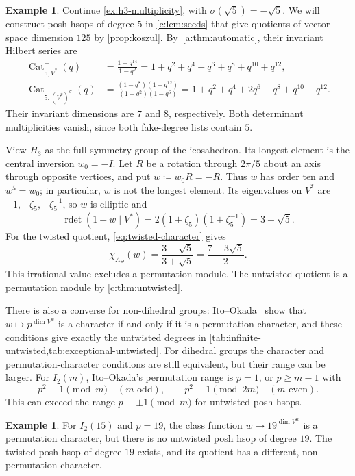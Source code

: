 \documentclass[11pt]{amsart}
\newcommand{\defeq}{\coloneqq}
\DeclareMathOperator{\Cat}{Cat}
\DeclareMathOperator{\rdet}{rdet}
\theoremstyle{definition}
\newtheorem{example}[theorem]{Example}
\begin{document}
\begin{example}\label{ex:h3-two-types}
Continue \cref{ex:h3-multiplicity}, with $\sigma(\sqrt5)=-\sqrt5$. We will construct posh hsops of degree $5$ in \cref{c:lem:seeds}
that give quotients of vector-space dimension $125$ by \cref{prop:koszul}.
By~\cref{a:thm:automatic}, their invariant Hilbert series are
\begin{align*}
 \Cat^+_{5,V^*}(q)
 &=\frac{1-q^{14}}{1-q^2}
   =1+q^2+q^4+q^6+q^8+q^{10}+q^{12},\\
 \Cat^+_{5,(V^*)^\sigma}(q)
 &=\frac{(1-q^8)(1-q^{12})}{(1-q^2)(1-q^6)}
   =1+q^2+q^4+2q^6+q^8+q^{10}+q^{12}.
\end{align*}
Their invariant dimensions are $7$ and $8$, respectively. Both
determinant multiplicities vanish, since both fake-degree lists contain $5$.

View $H_3$ as the full symmetry group of the icosahedron. Its longest
element is the central inversion $w_0=-I$. Let $R$ be a rotation through
$2\pi/5$ about an axis through opposite vertices, and put
$w\defeq w_0R=-R$. Thus $w$ has order ten and $w^5=w_0$; in particular,
$w$ is not the longest element. Its eigenvalues on $V^*$ are
$-1,-\zeta_5,-\zeta_5^{-1}$, so $w$ is elliptic and
\[
 \rdet(1-w\mid V^*)=2(1+\zeta_5)(1+\zeta_5^{-1})=3+\sqrt5.
\]
For the twisted quotient, \cref{eq:twisted-character} gives
\[
 \chi_{A_\Theta}(w)=\frac{3-\sqrt5}{3+\sqrt5}
                  =\frac{7-3\sqrt5}{2}.
\]
This irrational value excludes a permutation module. The untwisted
quotient is a permutation module by \cref{c:thm:untwisted}.
\end{example}

There is also a converse for non-dihedral groups:
Ito--Okada~\cite[Theorem 1.4]{IO} show that $w\mapsto p^{\dim V^w}$ is a character if and
only if it is a permutation character, and these conditions give
exactly the untwisted degrees in \cref{tab:infinite-untwisted,tab:exceptional-untwisted}.
For dihedral groups the character and permutation-character
conditions are still equivalent, but their range can be larger.
For $I_2(m)$, Ito--Okada's permutation range is $p=1$,
or $p\ge m-1$ with
\[
 p^2\equiv1\pmod m\quad(m\text{ odd}),\qquad
 p^2\equiv1\pmod{2m}\quad(m\text{ even}).
\]
This can exceed the range $p\equiv\pm1\pmod m$ for untwisted posh hsops.

\begin{example}\label{c:ex:dihedral-permutation-without-hsop}
For $I_2(15)$ and $p=19$, the class function
$w\mapsto19^{\dim V^w}$ is a permutation character, but there is no
untwisted posh hsop of degree $19$. The twisted
posh hsop of degree $19$ exists, and its quotient has a different, non-permutation character.
\end{example}
\end{document}
